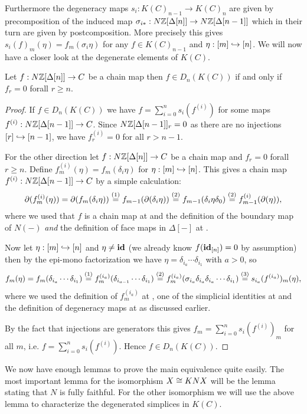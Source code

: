 Furthermore the degeneracy maps $s_i: K(C)_{n-1} \to K(C)_n$ are given by precomposition of the induced map $\sigma_{i\ast}: N\mathbb{Z}[\Delta[n]] \to N\mathbb{Z}[\Delta[n-1]]$ which in their turn are given by postcomposition. More precisely this gives $s_i(f)_m(\eta) = f_m(\sigma_i \eta)$ for any $f \in K(C)_{n-1}$ and $\eta: [m] \hookrightarrow [n]$. We will now have a closer look at the degenerate elements of $K(C)$.
\begin{lemma}
	\label{le:degen_k}
	Let $f: N\mathbb{Z}[\Delta[n]] \to C$ be a chain map then $f \in D_n(K(C))$ if and only if $f_r = 0$ forall $r \geq n$.
\end{lemma}
\begin{proof}
	If $f \in D_n(K(C))$ we have $f = \sum_{i=0}^n s_i(f^{(i)})$ for some maps $f^{(i)}: N\mathbb{Z}[\Delta[n-1]] \to C$. Since $N\mathbb{Z}[\Delta[n-1]]_r = 0$ as there are no injections $[r] \hookrightarrow [n-1]$, we have $f^{(i)}_r = 0$ for all $r > n-1$.

	For the other direction let $f: N\mathbb{Z}[\Delta[n]] \to C$ be a chain map and $f_r = 0$ forall $r \geq n$. Define $f_m^{(i)}(\eta) = f_m(\delta_i \eta)$ for $\eta: [m] \hookrightarrow [n]$. This gives a chain map $f^{(i)}: N\mathbb{Z}[\Delta[n-1]] \to C$ by a simple calculation:
	$$ \partial(f_m^{(i)}(\eta)) = \partial(f_m(\delta_i \eta)) \stackrel{(1)}{=} f_{m-1}(\partial(\delta_i \eta)) \stackrel{(2)}{=} f_{m-1}(\delta_i \eta \delta_0) \stackrel{(2)}{=} f_{m-1}^{(i)}(\partial(\eta)), $$
	where we used that $f$ is a chain map at  and the definition of the boundary map of $N(-)$ \emph{and} the definition of face maps in $\Delta[-]$ at .

	Now let $\eta: [m] \hookrightarrow [n]$ and $\eta \neq \mathbf{id}$ (we already know $f(\mathbf{id}_{[n]})=0$ by assumption) then by the epi-mono factorization we have $\eta = \delta_{i_a} \cdots \delta_{i_1}$ with $a>0$, so
	$$ f_m(\eta) = f_m(\delta_{i_a} \cdots \delta_{i_1}) \stackrel{(1)}{=} f_m^{(i_a)}(\delta_{i_{a-1}} \cdots \delta_{i_1}) \stackrel{(2)}{=} f_m^{(i_a)}(\sigma_{i_a} \delta_{i_a} \delta_{i_a} \cdots \delta_{i_1}) \stackrel{(3)}{=} s_{i_a}(f^{(i_a)})_m(\eta), $$
	where we used the definition of $f_m^{(i_a)}$ at , one of the simplicial identities at  and the definition of degeneracy maps at  as discussed earlier.

	By the fact that injections are generators this gives $f_m = \sum_{i=0}^n s_i(f^{(i)})_m$ for all $m$, i.e. $f = \sum_{i=0}^n s_i(f^{(i)})$. Hence $f \in D_n(K(C))$.
\end{proof}

We now have enough lemmas to prove the main equivalence quite easily. The most important lemma for the isomorphism $X \cong KNX$ will be the lemma stating that $N$ is fully faithful. For the other isomorphism we will use the above lemma to characterize the degenerated simplices in $K(C)$.

